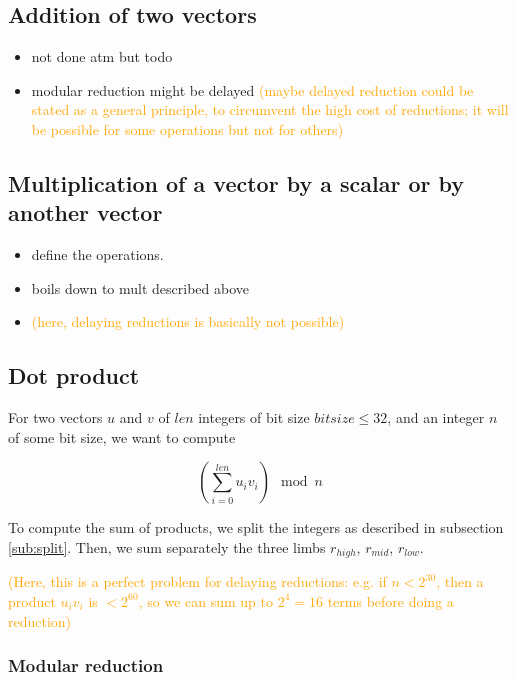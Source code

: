 \documentclass[a4paper]{article}
\begin{document}
\subsection{Addition of two vectors}

\begin{itemize}
    \item not done atm but todo 
    \item modular reduction might be delayed
      \textcolor{orange}{(maybe delayed reduction could be stated as a general principle,
      to circumvent the high cost of reductions;
      it will be possible for some operations but not for others)}
\end{itemize}

\subsection{Multiplication of a vector by a scalar or by another vector}

\begin{itemize}
    \item define the operations.
    \item boils down to mult described above
    \item \textcolor{orange}{(here, delaying reductions is basically not possible)}
\end{itemize}

\subsection{Dot product}

For two vectors $u$ and $v$ of $len$ integers of bit size $bitsize \le 32$, and an integer $n$ of some bit size, we want to compute

\[\left(\sum_{i=0}^{len}u_iv_i\right) \mod n\]

To compute the sum of products, we split the integers as described in subsection \ref{sub:split}. Then, we sum separately the three limbs $r_{high}$, $r_{mid}$, $r_{low}$. %

\textcolor{orange}{(Here, this is a perfect problem for delaying reductions: e.g. if \(n < 2^{30}\), then a product \(u_iv_i\) is \(< 2^{60}\), so we can sum up to \(2^4 = 16\) terms before doing a reduction)}

\subsubsection{Modular reduction}
\end{document}
